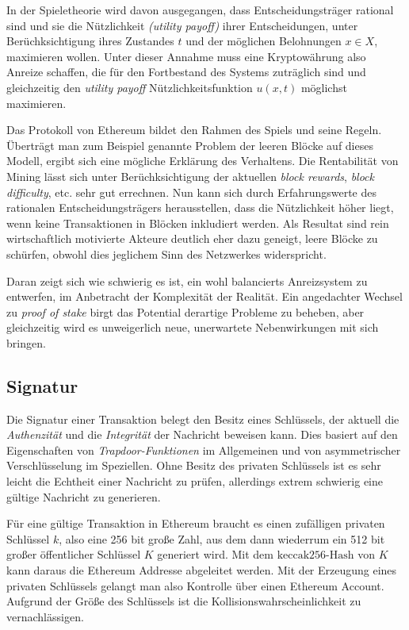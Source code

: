 \documentclass[runningheads]{llncs}
\begin{document}
In der Spieletheorie wird davon ausgegangen, dass Entscheidungsträger rational sind und sie die Nützlichkeit \textit{(utility payoff)} ihrer Entscheidungen, unter Berüchksichtigung ihres Zustandes $ t $ und der möglichen Belohnungen $ x \in X $,  maximieren wollen. Unter dieser Annahme muss eine Kryptowährung also Anreize schaffen, die für den Fortbestand des Systems zuträglich sind und gleichzeitig den \textit{utility payoff} Nützlichkeitsfunktion $ u(x, t) $ möglichst maximieren.  \cite[S. 2 ff.]{myerson_game_1997}

Das Protokoll von Ethereum bildet den Rahmen des Spiels und seine Regeln. Überträgt man zum Beispiel genannte Problem der leeren Blöcke auf dieses Modell, ergibt sich eine mögliche Erklärung des Verhaltens. Die Rentabilität von Mining lässt sich unter Berüchksichtigung der aktuellen \textit{block rewards}, \textit{block difficulty}, etc. sehr gut errechnen. \cite{noauthor_ethereum_nodate} Nun kann sich durch Erfahrungswerte des rationalen Entscheidungsträgers herausstellen, dass die Nützlichkeit höher liegt, wenn keine Transaktionen in Blöcken inkludiert werden. Als Resultat sind rein wirtschaftlich motivierte Akteure deutlich eher dazu geneigt, leere Blöcke zu schürfen, obwohl dies jeglichem Sinn des Netzwerkes widerspricht.

Daran zeigt sich wie schwierig es ist, ein wohl balancierts Anreizsystem zu entwerfen, im Anbetracht der Komplexität der Realität. Ein angedachter Wechsel zu \textit{proof of stake} birgt das Potential derartige Probleme zu beheben, aber gleichzeitig wird es unweigerlich neue, unerwartete Nebenwirkungen mit sich bringen. \cite{noauthor_ethereum/wiki_pos_nodate}

\subsection{Signatur}
Die Signatur einer Transaktion belegt den Besitz eines Schlüssels, der aktuell die \textit{Authenzität} und die \textit{Integrität} der Nachricht beweisen kann. Dies basiert auf den Eigenschaften von \textit{Trapdoor-Funktionen} im Allgemeinen und von asymmetrischer Verschlüsselung im Speziellen. Ohne Besitz des privaten Schlüssels ist es sehr leicht die Echtheit einer Nachricht zu prüfen, allerdings extrem schwierig eine gültige Nachricht zu generieren. \cite{roeder_asymmetric-key_nodate}

Für eine gültige Transaktion in Ethereum braucht es einen zufälligen privaten Schlüssel $ k $, also eine 256 bit große Zahl, aus dem dann wiederrum ein 512 bit großer öffentlicher Schlüssel $ K $ generiert wird. Mit dem $ \text{keccak256-Hash} $ von $ K $ kann daraus die Ethereum Addresse abgeleitet werden. Mit der Erzeugung eines privaten Schlüssels gelangt man also Kontrolle über einen Ethereum Account. Aufgrund der Größe des Schlüssels ist die Kollisionswahrscheinlichkeit zu vernachlässigen.
\end{document}
